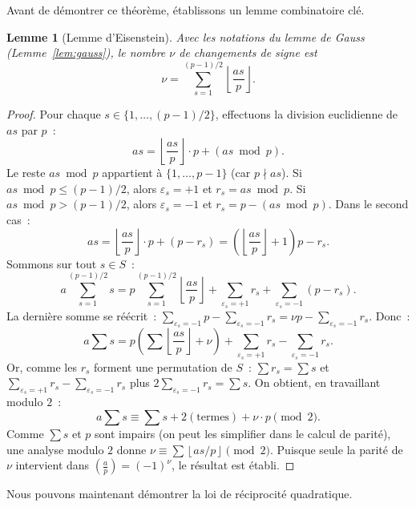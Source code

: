 \documentclass[12pt,a4paper,openany]{book}
\theoremstyle{definition}
\theoremstyle{plain}
\newtheorem{lemme}[definition]{Lemme}
\theoremstyle{remark}
\newcommand{\floor}[1]{\left\lfloor #1 \right\rfloor}
\newcommand{\legendre}[2]{\left(\frac{#1}{#2}\right)}
\begin{document}
Avant de démontrer ce théorème, établissons un lemme combinatoire clé.

\begin{lemme}[Lemme d'Eisenstein]
\label{lem:eisenstein}
Avec les notations du lemme de Gauss (Lemme~\ref{lem:gauss}), le nombre $\nu$
de changements de signe est
\[
  \nu = \sum_{s=1}^{(p-1)/2} \floor{\frac{as}{p}}.
\]
\end{lemme}

\begin{proof}
Pour chaque $s \in \{1, \ldots, (p-1)/2\}$, effectuons la division euclidienne
de $as$ par $p$~:
\[
  as = \floor{\frac{as}{p}} \cdot p + (as \bmod p).
\]
Le reste $as \bmod p$ appartient à $\{1, \ldots, p-1\}$ (car $p \nmid as$).
Si $as \bmod p \leq (p-1)/2$, alors $\varepsilon_s = +1$ et $r_s = as \bmod p$.
Si $as \bmod p > (p-1)/2$, alors $\varepsilon_s = -1$ et $r_s = p - (as \bmod p)$.
Dans le second cas~:
\[
  as = \floor{\frac{as}{p}} \cdot p + (p - r_s)
     = \left(\floor{\frac{as}{p}} + 1\right) p - r_s.
\]
Sommons sur tout $s \in S$~:
\[
  a \sum_{s=1}^{(p-1)/2} s
  = p \sum_{s=1}^{(p-1)/2} \floor{\frac{as}{p}}
    + \sum_{\varepsilon_s = +1} r_s + \sum_{\varepsilon_s = -1} (p - r_s).
\]
La dernière somme se réécrit~:
$\sum_{\varepsilon_s = -1} p - \sum_{\varepsilon_s = -1} r_s = \nu p - \sum_{\varepsilon_s = -1} r_s$.
Donc~:
\[
  a \sum s = p \left(\sum \floor{\frac{as}{p}} + \nu\right)
           + \sum_{\varepsilon_s = +1} r_s - \sum_{\varepsilon_s = -1} r_s.
\]
Or, comme les $r_s$ forment une permutation de $S$~:
$\sum r_s = \sum s$ et
$\sum_{\varepsilon_s = +1} r_s - \sum_{\varepsilon_s = -1} r_s$
plus $2\sum_{\varepsilon_s = -1} r_s = \sum s$. On obtient, en travaillant
modulo $2$~:
\[
  a \sum s \equiv \sum s + 2\left(\text{termes}\right) + \nu \cdot p \pmod{2}.
\]
Comme $\sum s$ et $p$ sont impairs (on peut les simplifier dans le calcul de parité),
une analyse modulo $2$ donne $\nu \equiv \sum \floor{as/p} \pmod{2}$.
Puisque seule la parité de $\nu$ intervient dans $\legendre{a}{p} = (-1)^\nu$,
le résultat est établi.
\end{proof}

Nous pouvons maintenant démontrer la loi de réciprocité quadratique.
\end{document}
